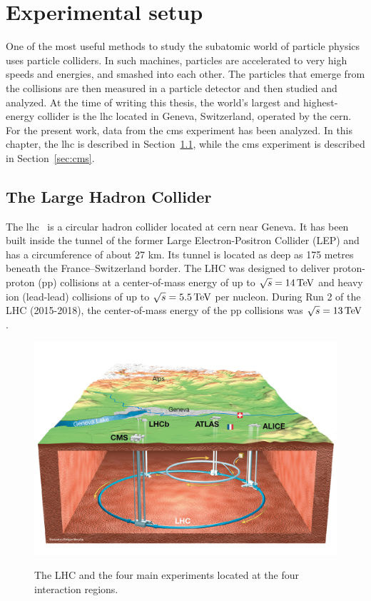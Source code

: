 \chapter{Experimental setup}
\label{sec:experimental-setup}

One of the most useful methods to study the subatomic world of particle physics uses particle colliders. In such machines, particles are accelerated to very high speeds and energies, and smashed into each other. The particles that emerge from the collisions are then measured in a particle detector and then studied and analyzed. At the time of writing this thesis, the world's largest and highest-energy collider is the \gls{lhc} located in Geneva, Switzerland, operated by the \gls{cern}. For the present work, data from the \gls{cms} experiment has been analyzed. In this chapter, the \gls{lhc} is described in Section~\ref{sec:lhc}, while the \gls{cms} experiment is described in Section~\ref{sec:cms}. 

\section{The Large Hadron Collider}
\label{sec:lhc}

The \gls{lhc}~\cite{Bruning:2004ej, Buning:2004wk,Benedikt:2004wm} is a circular hadron collider located at \gls{cern} near Geneva. It has been built inside the tunnel of the former Large Electron-Positron Collider (LEP) and has a circumference of about 27 km. Its tunnel is located as deep as 175 metres beneath the France–Switzerland border. The LHC was designed to deliver proton-proton (pp) collisions at a center-of-mass energy of up to $\sqrt{s} = 14\,\text{Te\hspace{-.08em}V}$ and heavy ion (lead-lead) collisions of up to $\sqrt{s} = 5.5\,\text{Te\hspace{-.08em}V}$ per nucleon. During Run 2 of the LHC (2015-2018), the center-of-mass energy of the pp collisions was $\sqrt{s} = 13\,\text{Te\hspace{-.08em}V}$.

\begin{figure}[!htb]
\centering
\includegraphics[width=0.75\linewidth]{plots/detector/LHC_overview.png}  \\
\caption[LHC overview]{The LHC and the four main experiments located at the four interaction regions.}
\label{fig:lhc-overview}
\end{figure}

